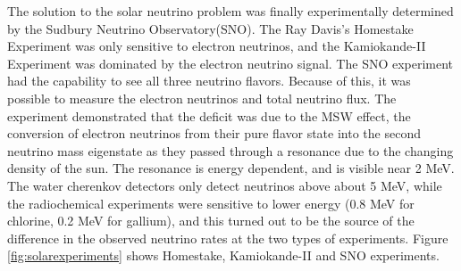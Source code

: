 The solution to the solar neutrino problem was finally experimentally determined by the Sudbury Neutrino Observatory(SNO). The Ray Davis's Homestake Experiment was only sensitive to electron neutrinos, and the Kamiokande-II Experiment was dominated by the electron neutrino signal. The SNO experiment had the capability to see all three neutrino flavors. Because of this, it was possible to measure the electron neutrinos and total neutrino flux. The experiment demonstrated that the deficit was due to the MSW effect,  the conversion of electron neutrinos from their pure flavor state into the second neutrino mass eigenstate as they passed through a resonance due to the changing density of the sun. The resonance is energy dependent, and is visible near 2 MeV. The water cherenkov detectors only detect neutrinos above about 5 MeV, while the radiochemical experiments were sensitive to lower energy (0.8 MeV for chlorine, 0.2 MeV for gallium), and this turned out to be the source of the difference in the observed neutrino rates at the two types of experiments. Figure \ref{fig:solarexperiments} shows Homestake, Kamiokande-II and SNO experiments. 
